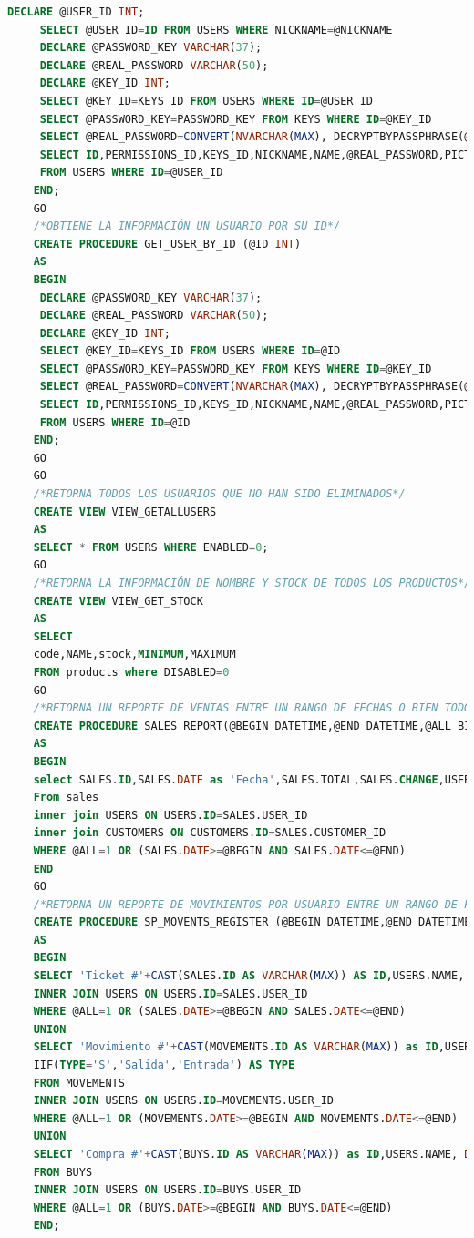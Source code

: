 \documentclass[a4paper,DIV=12]{scrreprt}
\begin{document}
\begin{lstlisting}[language={SQL}]
     DECLARE @USER_ID INT;
     SELECT @USER_ID=ID FROM USERS WHERE NICKNAME=@NICKNAME
     DECLARE @PASSWORD_KEY VARCHAR(37);
     DECLARE @REAL_PASSWORD VARCHAR(50);
     DECLARE @KEY_ID INT;
     SELECT @KEY_ID=KEYS_ID FROM USERS WHERE ID=@USER_ID
     SELECT @PASSWORD_KEY=PASSWORD_KEY FROM KEYS WHERE ID=@KEY_ID
     SELECT @REAL_PASSWORD=CONVERT(NVARCHAR(MAX), DECRYPTBYPASSPHRASE(@PASSWORD_KEY, PASSWORD)) FROM USERS WHERE ID=@USER_ID
     SELECT ID,PERMISSIONS_ID,KEYS_ID,NICKNAME,NAME,@REAL_PASSWORD,PICTURE,ENABLED 
     FROM USERS WHERE ID=@USER_ID
    END;
    GO
    /*OBTIENE LA INFORMACIÓN UN USUARIO POR SU ID*/
    CREATE PROCEDURE GET_USER_BY_ID (@ID INT)
    AS
    BEGIN
     DECLARE @PASSWORD_KEY VARCHAR(37);
     DECLARE @REAL_PASSWORD VARCHAR(50);
     DECLARE @KEY_ID INT;
     SELECT @KEY_ID=KEYS_ID FROM USERS WHERE ID=@ID
     SELECT @PASSWORD_KEY=PASSWORD_KEY FROM KEYS WHERE ID=@KEY_ID
     SELECT @REAL_PASSWORD=CONVERT(NVARCHAR(MAX), DECRYPTBYPASSPHRASE(@PASSWORD_KEY, PASSWORD)) FROM USERS WHERE ID=@ID
     SELECT ID,PERMISSIONS_ID,KEYS_ID,NICKNAME,NAME,@REAL_PASSWORD,PICTURE,ENABLED 
     FROM USERS WHERE ID=@ID
    END;
    GO
    GO
    /*RETORNA TODOS LOS USUARIOS QUE NO HAN SIDO ELIMINADOS*/
    CREATE VIEW VIEW_GETALLUSERS
    AS
    SELECT * FROM USERS	WHERE ENABLED=0;
    GO
    /*RETORNA LA INFORMACIÓN DE NOMBRE Y STOCK DE TODOS LOS PRODUCTOS*/
    CREATE VIEW VIEW_GET_STOCK
    AS
    SELECT 
    code,NAME,stock,MINIMUM,MAXIMUM
    FROM products where DISABLED=0
    GO 
    /*RETORNA UN REPORTE DE VENTAS ENTRE UN RANGO DE FECHAS O BIEN TODOS LOS REGISTROS*/
    CREATE PROCEDURE SALES_REPORT(@BEGIN DATETIME,@END DATETIME,@ALL BIT)
    AS
    BEGIN
    select SALES.ID,SALES.DATE as 'Fecha',SALES.TOTAL,SALES.CHANGE,USERS.NAME as 'User',CUSTOMERS.NAME as 'Customers' 
    From sales
    inner join USERS ON USERS.ID=SALES.USER_ID
    inner join CUSTOMERS ON CUSTOMERS.ID=SALES.CUSTOMER_ID
    WHERE @ALL=1 OR (SALES.DATE>=@BEGIN AND SALES.DATE<=@END)
    END
    GO
    /*RETORNA UN REPORTE DE MOVIMIENTOS POR USUARIO ENTRE UN RANGO DE FECHAS O BIEN TODOS LOS REGISTROS*/
    CREATE PROCEDURE SP_MOVENTS_REGISTER (@BEGIN DATETIME,@END DATETIME,@ALL BIT)
    AS
    BEGIN
    SELECT 'Ticket #'+CAST(SALES.ID AS VARCHAR(MAX)) AS ID,USERS.NAME, DATE AS 'Fecha' ,'Venta'AS TYPE FROM SALES
    INNER JOIN USERS ON USERS.ID=SALES.USER_ID
    WHERE @ALL=1 OR (SALES.DATE>=@BEGIN AND SALES.DATE<=@END)
    UNION 
    SELECT 'Movimiento #'+CAST(MOVEMENTS.ID AS VARCHAR(MAX)) as ID,USERS.NAME, DATE AS 'Fecha',
    IIF(TYPE='S','Salida','Entrada') AS TYPE  
    FROM MOVEMENTS
    INNER JOIN USERS ON USERS.ID=MOVEMENTS.USER_ID
    WHERE @ALL=1 OR (MOVEMENTS.DATE>=@BEGIN AND MOVEMENTS.DATE<=@END)
    UNION 
    SELECT 'Compra #'+CAST(BUYS.ID AS VARCHAR(MAX)) as ID,USERS.NAME, DATE AS 'Fecha','Compra' AS TYPE  
    FROM BUYS
    INNER JOIN USERS ON USERS.ID=BUYS.USER_ID
    WHERE @ALL=1 OR (BUYS.DATE>=@BEGIN AND BUYS.DATE<=@END)
    END;
\end{lstlisting}
\end{document}
